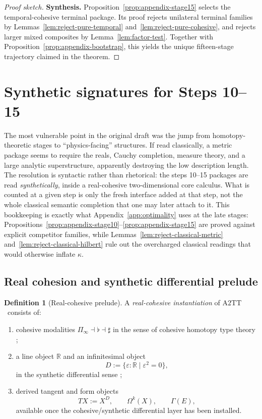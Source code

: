 \documentclass{lmcs}
\theoremstyle{plain}
\theoremstyle{definition}
\newtheorem{defi}[thm]{Definition}
\theoremstyle{remark}
\newcommand{\R}{\ensuremath{\mathbb{R}}}
\newcommand{\ATwo}{\ensuremath{\mathrm{A2TT}}}
\newcommand{\sharpm}{\ensuremath{\mathbin{\sharp}}}
\begin{document}
\begin{proof}[Proof sketch]
\smallskip
\noindent\textbf{Synthesis.}
Proposition~\ref{prop:appendix-stage15} selects the temporal-cohesive terminal package.
Its proof rejects unilateral terminal families by Lemmas~\ref{lem:reject-pure-temporal} and~\ref{lem:reject-pure-cohesive}, and rejects larger mixed composites by Lemma~\ref{lem:factor-test}.
Together with Proposition~\ref{prop:appendix-bootstrap}, this yields the unique fifteen-stage trajectory claimed in the theorem.
\end{proof}

\section{Synthetic signatures for Steps 10--15}
\label{sec:synthetic}

The most vulnerable point in the original draft was the jump from homotopy-theoretic stages to ``physics-facing'' structures.
If read classically, a metric package seems to require the reals, Cauchy completion, measure theory, and a large analytic superstructure, apparently destroying the low description length.
The resolution is syntactic rather than rhetorical: the steps 10--15 packages are read \emph{synthetically}, inside a real-cohesive two-dimensional core calculus.
What is counted at a given step is only the fresh interface added at that step, not the whole classical semantic completion that one may later attach to it.
This bookkeeping is exactly what Appendix~\ref{app:optimality} uses at the late stages: Propositions~\ref{prop:appendix-stage10}--\ref{prop:appendix-stage15} are proved against explicit competitor families, while Lemmas~\ref{lem:reject-classical-metric} and~\ref{lem:reject-classical-hilbert} rule out the overcharged classical readings that would otherwise inflate $\kappa$.

\subsection{Real cohesion and synthetic differential prelude}

\begin{defi}[Real-cohesive prelude]
A \emph{real-cohesive instantiation} of \ATwo\ consists of:
\begin{enumerate}[label=(\arabic*),nosep]
  \item cohesive modalities $\Pi_\infty \dashv \flat \dashv \sharpm$ in the sense of cohesive homotopy type theory \cite{schreiber-shulman-qft,lawvere-cohesion,modalities-hott};
  \item a line object $\R$ and an infinitesimal object
  \[
    D := \{\varepsilon:\R \mid \varepsilon^2=0\},
  \]
  in the synthetic differential sense \cite{kock-sdg,schreiber-dcct};
  \item derived tangent and form objects
  \[
    TX := X^D,\qquad \Omega^k(X),\qquad \Gamma(E),
  \]
  available once the cohesive/synthetic differential layer has been installed.
\end{enumerate}
\end{defi}
\end{document}
